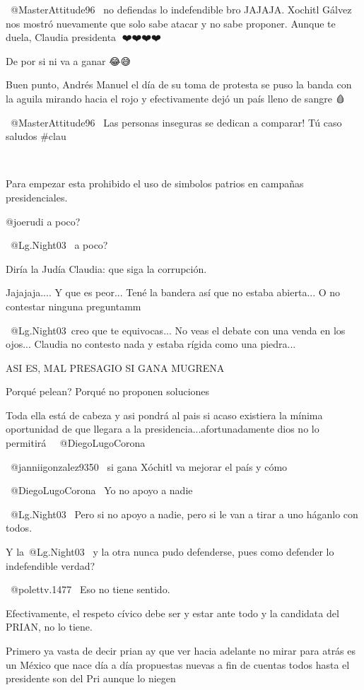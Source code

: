  @MasterAttitude96  no defiendas lo indefendible bro JAJAJA. Xochitl Gálvez nos mostró nuevamente que solo sabe atacar y no sabe proponer. Aunque te duela, Claudia presidenta 💅❤️❤️❤️❤️

De por si ni va a ganar 😂😅

Buen punto, Andrés Manuel el día de su toma de protesta se puso la banda con la aguila mirando hacia el rojo y efectivamente dejó un país lleno de sangre 🩸

​ @MasterAttitude96  Las personas inseguras se dedican a comparar! Tú caso 🙈💁🏻‍♀️💃🏻saludos #clau

💃🏻💃🏻

Para empezar esta prohibido el uso de simbolos patrios en campañas presidenciales.

@joerudi a  poco?

​ @Lg.Night03  a poco?

Diría la Judía Claudia: que siga la corrupción.

Jajajaja.... Y que es peor... Tené la bandera así que no estaba abierta... O no contestar ninguna preguntamm

​ @Lg.Night03 creo que te equivocas... No veas el debate con una venda en los ojos... Claudia no contesto nada y estaba rígida como una piedra...

ASI ES, MAL PRESAGIO SI GANA MUGRENA

Porqué pelean? Porqué no proponen soluciones

Toda ella está  de cabeza y asi pondrá  al pais si acaso existiera la mínima  oportunidad de que llegara a la presidencia...afortunadamente dios no lo permitirá 🙏🙏​ @DiegoLugoCorona 

 @janniigonzalez9350  si gana Xóchitl va mejorar el país y cómo

 @DiegoLugoCorona  Yo no apoyo a nadie

 @Lg.Night03  Pero si no apoyo a nadie, pero si le van a tirar a uno háganlo con todos.

Y la​ @Lg.Night03  y la otra nunca pudo defenderse, pues como defender lo indefendible verdad?

 @polettv.1477  Eso no tiene sentido.

Efectivamente, el respeto cívico debe ser y estar ante todo y la candidata del PRIAN, no lo tiene.

Primero ya vasta de decir prian ay que ver hacia adelante no mirar para atrás es un México que nace día a día propuestas nuevas a fin de cuentas todos hasta el presidente son del Pri aunque lo niegen

